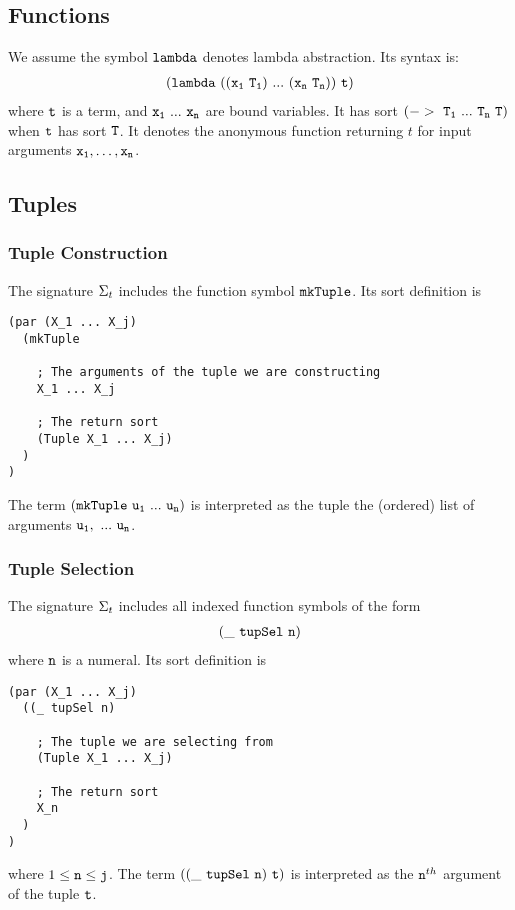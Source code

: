 \documentclass[english,a4paper,10pt]{article}
\begin{document}
\subsection{Functions}
We assume
the symbol ${\tt lambda}$ denotes lambda abstraction.
Its syntax is:
\begin{align*}
{\tt  
(lambda\ ((x_1\ T_1)\ ...\ (x_n\ T_n))\ t)
}
\end{align*}
where ${\tt t}$ is a term,
and ${\tt x_1\ ...\ x_n}$ are bound variables.
It has sort $\syntax{(->\ T_1\ ...\ T_n\ T)}$
when ${\tt t}$ has sort ${\tt T}$.
It denotes the anonymous function
returning $t$ for input arguments ${\tt x_1}, \ldots, {\tt x_n}$.

\subsection{Tuples}

\subsubsection{Tuple Construction}
The signature $\Sigma_{t}$ includes 
the function symbol ${\tt mkTuple}$.
Its sort definition is
\begin{verbatim}
(par (X_1 ... X_j) 
  (mkTuple
  
    ; The arguments of the tuple we are constructing
    X_1 ... X_j
    
    ; The return sort
    (Tuple X_1 ... X_j)
  )
)
\end{verbatim}
The term $\syntax{(mkTuple\ u_1\ ...\ u_n)}$ is
interpreted as the tuple the (ordered) list of arguments $\syntax{u_1,\ ...\ u_n}$. 

\subsubsection{Tuple Selection}
The signature $\Sigma_{t}$ includes 
all indexed function symbols of the form
\begin{align*}
{\tt  
(\_\ tupSel\ n)
}
\end{align*}
where ${\tt n}$ is a numeral.
Its sort definition is
\begin{verbatim}
(par (X_1 ... X_j) 
  ((_ tupSel n)
  
    ; The tuple we are selecting from
    (Tuple X_1 ... X_j)
    
    ; The return sort
    X_n
  )
)
\end{verbatim}
where $1 \leq {\tt n} \leq {\tt j}$.
The term $\syntax{((\_\ tupSel\ n)\ t)}$ is
interpreted as the ${\tt n}^{th}$ argument of the tuple ${\tt t}$.
\end{document}
